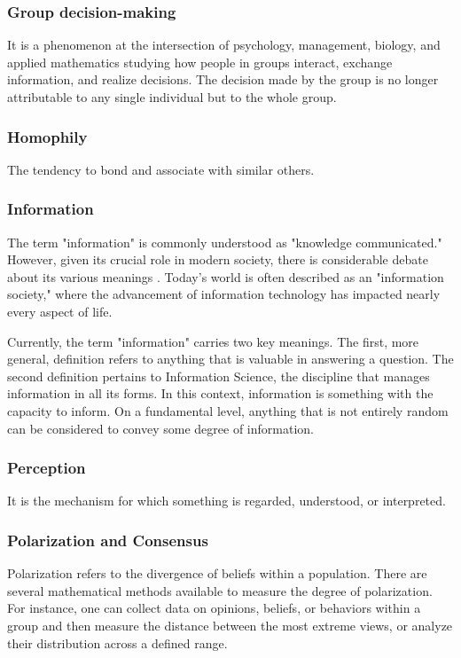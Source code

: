 \subsubsection{Group decision-making} It is a phenomenon at the intersection of psychology, management, biology, and applied mathematics studying how people in groups interact, exchange information, and realize decisions. The decision made by the group is no longer attributable to any single individual but to the whole group. 

\subsubsection{Homophily} The tendency to bond and associate with similar others. 

\subsubsection{Information} The term "information" is commonly understood as "knowledge communicated." However, given its crucial role in modern society, there is considerable debate about its various meanings \cite{Capurro_2003}. Today’s world is often described as an "information society," where the advancement of information technology has impacted nearly every aspect of life.

Currently, the term "information" carries two key meanings. The first, more general, definition refers to anything that is valuable in answering a question. The second definition pertains to Information Science, the discipline that manages information in all its forms. In this context, information is something with the capacity to inform. On a fundamental level, anything that is not entirely random can be considered to convey some degree of information. 

\subsubsection{Perception} It is the mechanism for which something is regarded, understood, or interpreted.

\subsubsection{Polarization and Consensus}

Polarization refers to the divergence of beliefs within a population. There are several mathematical methods available to measure the degree of polarization. For instance, one can collect data on opinions, beliefs, or behaviors within a group and then measure the distance between the most extreme views, or analyze their distribution across a defined range.

